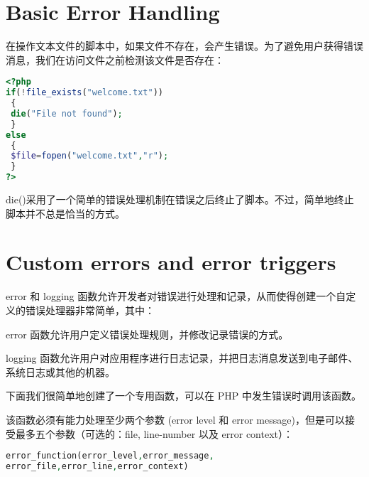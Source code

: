 \section{Basic Error Handling}



在操作文本文件的脚本中，如果文件不存在，会产生错误。为了避免用户获得错误消息，我们在访问文件之前检测该文件是否存在：


\begin{lstlisting}[language=PHP]
<?php
if(!file_exists("welcome.txt"))
 {
 die("File not found");
 }
else
 {
 $file=fopen("welcome.txt","r");
 }
?>
\end{lstlisting}

die()采用了一个简单的错误处理机制在错误之后终止了脚本。不过，简单地终止脚本并不总是恰当的方式。





\section{Custom errors and error triggers}

error 和 logging 函数允许开发者对错误进行处理和记录，从而使得创建一个自定义的错误处理器非常简单，其中：

\begin{compactitem}
\item error 函数允许用户定义错误处理规则，并修改记录错误的方式。
\item logging 函数允许用户对应用程序进行日志记录，并把日志消息发送到电子邮件、系统日志或其他的机器。
\end{compactitem}


下面我们很简单地创建了一个专用函数，可以在 PHP 中发生错误时调用该函数。

该函数必须有能力处理至少两个参数 (error level 和 error message)，但是可以接受最多五个参数（可选的：file, line-number 以及 error context）：

\begin{lstlisting}[language=PHP]
error_function(error_level,error_message,
error_file,error_line,error_context)
\end{lstlisting}

